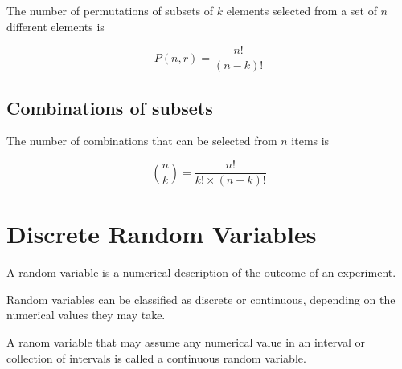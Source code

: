 The number of permutations of subsets of $k$ elements selected from a set of $n$ different elements is

\[P(n,r) = \frac{n!}{(n-k)!}  \]


\subsection{Combinations of subsets}

The number of combinations that can be selected from $n$ items is

\[ {n \choose k} = \frac{n!}{k! \times (n-k)!}  \]
\newpage
\section{Discrete Random Variables}

A random variable is a numerical description of the outcome of an experiment.

Random variables can be classified as discrete or continuous, depending on the numerical values they may take.

A ranom variable that may assume any numerical value in an interval or collection of intervals is called a continuous random variable.




